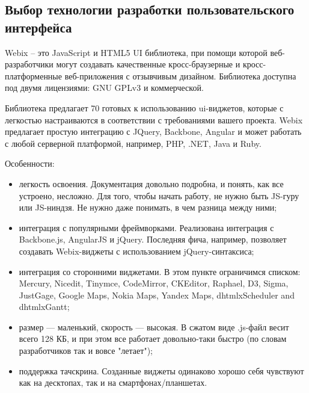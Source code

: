 \subsection{Выбор технологии разработки пользовательского интерфейса}
\label{sec:modeling:ui_technology}

Webix – это JavaScript и HTML5 UI библиотека, при помощи которой веб-разработчики могут создавать качественные кросс-браузерные и кросс-платформенные веб-приложения с отзывчивым дизайном. Библиотека доступна под двумя лицензиями: GNU GPLv3 и коммерческой.

Библиотека предлагает 70 готовых к использованию ui-виджетов, которые с легкостью настраиваются в соответствии с требованиями вашего проекта. Webix предлагает простую интеграцию с JQuery, Backbone, Angular и может работать с любой серверной платформой, например, PHP, .NET, Java и Ruby.

Особенности:

\begin{itemize}
    \item легкость освоения. Документация довольно подробна, и понять, как все устроено, несложно. Для того, чтобы начать работу, не нужно быть JS-гуру или JS-ниндзя. Не нужно даже понимать, в чем разница между ними;
    \item интеграция с популярными фреймворками. Реализована интеграция с Backbone.js, AngularJS и jQuery. Последняя фича, например, позволяет создавать Webix-виджеты с использованием jQuery-синтаксиса;
    \item интеграция со сторонними виджетами. В этом пункте ограничимся списком: Mercury, Nicedit, Tinymce, CodeMirror, CKEditor, Raphael, D3, Sigma, JustGage, Google Maps, Nokia Maps, Yandex Maps, dhtmlxScheduler and dhtmlxGantt;
    \item размер — маленький, скорость — высокая. В сжатом виде .js-файл весит всего 128 КБ, и при этом все работает довольно-таки быстро (по словам разработчиков так и вовсе "летает");
    \item поддержка тачскрина. Созданные виджеты одинаково хорошо себя чувствуют как на десктопах, так и на смартфонах/планшетах.
\end{itemize}

